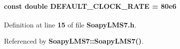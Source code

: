 \paragraph[{D\+E\+F\+A\+U\+L\+T\+\_\+\+C\+L\+O\+C\+K\+\_\+\+R\+A\+TE}]{\setlength{\rightskip}{0pt plus 5cm}const double D\+E\+F\+A\+U\+L\+T\+\_\+\+C\+L\+O\+C\+K\+\_\+\+R\+A\+TE = 80e6\hspace{0.3cm}{\ttfamily [static]}}\label{SoapyLMS7_8h_a5d9790f0c6698fd1fbba1c0dc14af5d1}


Definition at line {\bf 15} of file {\bf Soapy\+L\+M\+S7.\+h}.



Referenced by {\bf Soapy\+L\+M\+S7\+::\+Soapy\+L\+M\+S7()}.

